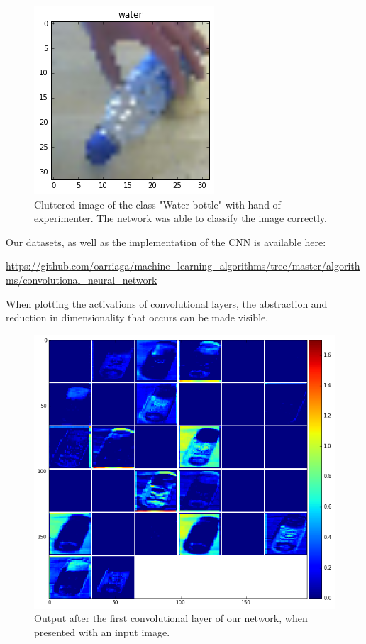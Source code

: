 \documentclass[	DIV=calc,%
				paper=a4,%
				fontsize=11pt,%
				twocolumn]{scrartcl}	 %
\begin{document}
\begin{figure}[H]
    \centering
    \includegraphics[width=0.5\linewidth]{data/cluttered_image}
    \caption{Cluttered image of the class "Water bottle" with hand of experimenter. The network was able to classify the image correctly.}
\end{figure}

Our datasets, as well as the implementation of the CNN is available here: \begin{small}\url{https://github.com/oarriaga/machine_learning_algorithms/tree/master/algorithms/convolutional_neural_network}\end{small}

When plotting the activations of convolutional layers, the abstraction and reduction in dimensionality that occurs can be made visible.

\begin{figure}[H]
    \centering
    \includegraphics[width=0.5\linewidth]{data/final_cnn_firstlayer}
    \caption{Output after the first convolutional layer of our network, when presented with an input image.}
\end{figure}
\end{document}
